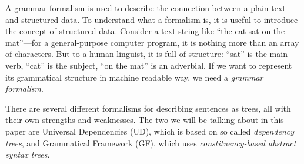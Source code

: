 A grammar formalism is used to describe the connection between a plain text and structured data. To understand what a formalism is, it is useful to introduce the concept of structured data. Consider a text string like ``the cat sat on the mat''—for a general-purpose computer program, it is nothing more than an array of characters. But to a human linguist, it is full of structure: ``sat'' is the main verb, ``cat'' is the subject, “on the mat” is an adverbial. If we want to represent its grammatical structure in machine readable way, we need a \emph{grammar formalism}.










There are several different formalisms for describing sentences as trees, all with their own strengths and weaknesses.
The two we will be talking about in this paper are Universal Dependencies (UD), which is based on so called \emph{dependency trees}, and Grammatical Framework (GF), which uses \emph{constituency-based abstract syntax trees}.




